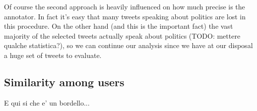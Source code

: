 \documentclass[a4paper,11pt,oneside]{article}
\begin{document}
Of course the second approach is heavily influenced on how much precise is the annotator. In fact it's easy that many tweets speaking about politics are lost in this procedure. On the other hand (and this is the important fact) the vast majority of the selected tweets actually speak about politics (TODO: mettere qualche statistica?), so we can continue our analysis since we have at our disposal a huge set of tweets to evaluate.

\subsection{Similarity among users}
E qui si che e' un bordello...

%
\end{document}
